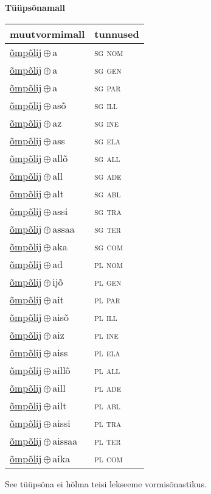 

\vspace{3.5em}
\noindent \begin{minipage}{\textwidth}
\noindent \textbf{Tüüpsõnamall \,}\\

\begin{sideways}
\begin{tabular}{l l}
muutvormimall & tunnused \\
\hline
\underline{õmpõlij}\,$\oplus$\,a & \textsc{ sg nom } \\
\underline{õmpõlij}\,$\oplus$\,a & \textsc{ sg gen } \\
\underline{õmpõlij}\,$\oplus$\,a & \textsc{ sg par } \\
\underline{õmpõlij}\,$\oplus$\,asõ & \textsc{ sg ill } \\
\underline{õmpõlij}\,$\oplus$\,az & \textsc{ sg ine } \\
\underline{õmpõlij}\,$\oplus$\,ass & \textsc{ sg ela } \\
\underline{õmpõlij}\,$\oplus$\,allõ & \textsc{ sg all } \\
\underline{õmpõlij}\,$\oplus$\,all & \textsc{ sg ade } \\
\underline{õmpõlij}\,$\oplus$\,alt & \textsc{ sg abl } \\
\underline{õmpõlij}\,$\oplus$\,assi & \textsc{ sg tra } \\
\underline{õmpõlij}\,$\oplus$\,assaa & \textsc{ sg ter } \\
\underline{õmpõlij}\,$\oplus$\,aka & \textsc{ sg com } \\
\underline{õmpõlij}\,$\oplus$\,ad & \textsc{ pl nom } \\
\underline{õmpõlij}\,$\oplus$\,ijõ & \textsc{ pl gen } \\
\underline{õmpõlij}\,$\oplus$\,ait & \textsc{ pl par } \\
\underline{õmpõlij}\,$\oplus$\,aisõ & \textsc{ pl ill } \\
\underline{õmpõlij}\,$\oplus$\,aiz & \textsc{ pl ine } \\
\underline{õmpõlij}\,$\oplus$\,aiss & \textsc{ pl ela } \\
\underline{õmpõlij}\,$\oplus$\,aillõ & \textsc{ pl all } \\
\underline{õmpõlij}\,$\oplus$\,aill & \textsc{ pl ade } \\
\underline{õmpõlij}\,$\oplus$\,ailt & \textsc{ pl abl } \\
\underline{õmpõlij}\,$\oplus$\,aissi & \textsc{ pl tra } \\
\underline{õmpõlij}\,$\oplus$\,aissaa & \textsc{ pl ter } \\
\underline{õmpõlij}\,$\oplus$\,aika & \textsc{ pl com } \\
\end{tabular}
\end{sideways}
\label{tab:tüüpsõnamall-õmpõlija}

\end{minipage}

 
\vspace{1em}
\noindent See tüüpsõna ei hõlma teisi lekseeme vormi\-sõnastikus.

